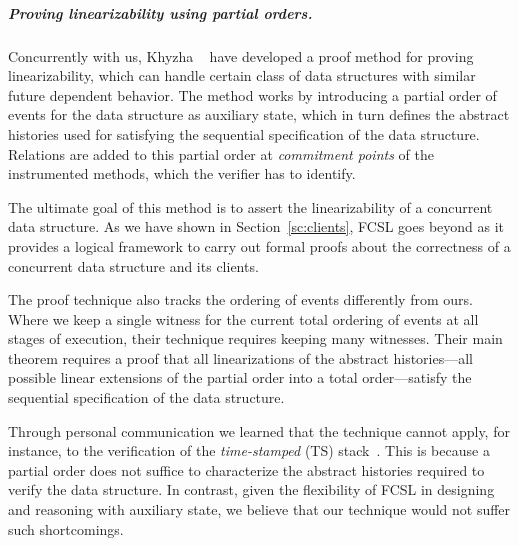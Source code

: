 \subparagraph*{Proving linearizability using partial orders.}
Concurrently with us, Khyzha \etal~\cite{KhyzhaGP+ESOP17} have
developed a proof method for proving linearizability, which can handle
certain class of data structures with similar future dependent
behavior.
%
The method works by introducing a partial order of events for the data
structure as auxiliary state, which in turn defines the abstract
histories used for satisfying the sequential specification of the data
structure. Relations are added to this partial order at {\it
  commitment points} of the instrumented methods, which the verifier
has to identify.

The ultimate goal of this method is to assert the
linearizability of a concurrent data structure. As we have shown in
Section~\ref{sc:clients}, FCSL goes beyond as it provides a logical
framework to carry out formal proofs about the correctness of a
concurrent data structure and its clients.


The proof technique also tracks the ordering of events 
differently from ours. Where we keep a single witness for
the current total ordering of events at all stages of execution,
their technique requires keeping many witnesses. Their main theorem requires a
proof that all linearizations of the abstract histories---\ie all
possible linear extensions of the partial order into a total
order---satisfy the sequential specification of the data structure.


Through personal communication we learned that the
technique cannot apply, for instance, to the verification of the {\it
  time-stamped} (TS) stack~\cite{DoddsHK+POPL15}. This is because a
partial order does not suffice to characterize the abstract histories
required to verify the data structure.
%
In contrast, given the flexibility of FCSL in designing and reasoning
with auxiliary state, we believe that our technique would not suffer
such shortcomings.

